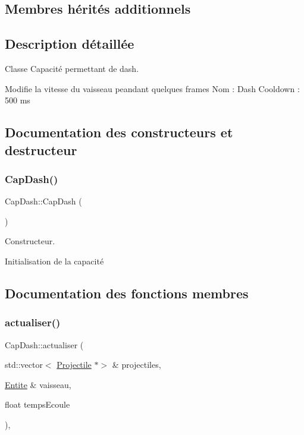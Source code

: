 \subsection*{Membres hérités additionnels}


\subsection{Description détaillée}
Classe Capacité permettant de dash. 

Modifie la vitesse du vaisseau peandant quelques frames Nom \+: Dash Cooldown \+: 500 ms 

\subsection{Documentation des constructeurs et destructeur}
\mbox{\label{class_cap_dash_ac38287e31284b6b5ac8add730830bfed}} 
\subsubsection{\texorpdfstring{Cap\+Dash()}{CapDash()}}
{\footnotesize\ttfamily Cap\+Dash\+::\+Cap\+Dash (\begin{DoxyParamCaption}{ }\end{DoxyParamCaption})}



Constructeur. 

Initialisation de la capacité 

\subsection{Documentation des fonctions membres}
\mbox{\label{class_cap_dash_a23e3009b85288e7aadce2eb2b581fac0}} 
\subsubsection{\texorpdfstring{actualiser()}{actualiser()}}
{\footnotesize\ttfamily Cap\+Dash\+::actualiser (\begin{DoxyParamCaption}\item[{std\+::vector$<$ \hyperlink{class_projectile}{Projectile} $\ast$$>$ \&}]{projectiles,  }\item[{\hyperlink{class_entite}{Entite} \&}]{vaisseau,  }\item[{float}]{temps\+Ecoule }\end{DoxyParamCaption})\hspace{0.3cm}{\ttfamily [override]}, {\ttfamily [virtual]}}



